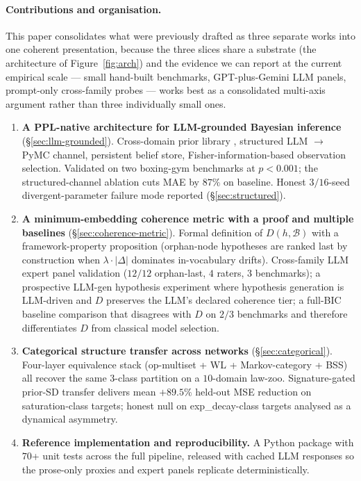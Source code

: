 \documentclass{article}
\begin{document}
\paragraph{Contributions and organisation.}
This paper consolidates what were previously drafted as three
separate works into one coherent presentation, because the three
slices share a substrate (the architecture of
Figure~\ref{fig:arch}) and the evidence we can report at the current
empirical scale --- small hand-built benchmarks, GPT-plus-Gemini
LLM panels, prompt-only cross-family probes --- works best as a
consolidated multi-axis argument rather than three individually
small ones.

\begin{enumerate}[leftmargin=*, itemsep=2pt]
\item \textbf{A PPL-native architecture for LLM-grounded Bayesian
inference} (\S\ref{sec:llm-grounded}). Cross-domain prior library
\citep{salvatier2016pymc, wong2023wordmodels}, structured LLM
$\to$ PyMC channel, persistent belief store, Fisher-information-based
observation selection. Validated on two boxing-gym benchmarks
at $p < 0.001$; the structured-channel ablation cuts MAE by $87\%$
on baseline. Honest $3/16$-seed divergent-parameter failure mode
reported (\S\ref{sec:structured}).

\item \textbf{A minimum-embedding coherence metric with a proof
and multiple baselines} (\S\ref{sec:coherence-metric}). Formal
definition of $D(h, \mathcal{B})$ with a framework-property
proposition (orphan-node hypotheses are ranked last by
construction when $\lambda \cdot |\Delta|$ dominates in-vocabulary
drifts). Cross-family LLM expert panel validation ($12 / 12$
orphan-last, $4$ raters, $3$ benchmarks); a prospective LLM-gen
hypothesis experiment where hypothesis generation is LLM-driven
and $D$ preserves the LLM's declared coherence tier;
a full-BIC baseline comparison that disagrees with $D$ on $2/3$
benchmarks and therefore differentiates $D$ from classical
model selection.

\item \textbf{Categorical structure transfer across networks}
(\S\ref{sec:categorical}). Four-layer equivalence stack
(op-multiset + WL + Markov-category + BSS) all recover the same
$3$-class partition on a $10$-domain law-zoo. Signature-gated
prior-SD transfer delivers mean $+89.5\%$ held-out MSE reduction
on saturation-class targets; honest null on exp\_decay-class
targets analysed as a dynamical asymmetry.

\item \textbf{Reference implementation and reproducibility.} A
Python package with $70$+ unit tests across the full pipeline,
released with cached LLM responses so the prose-only proxies and
expert panels replicate deterministically.
\end{enumerate}
\end{document}
